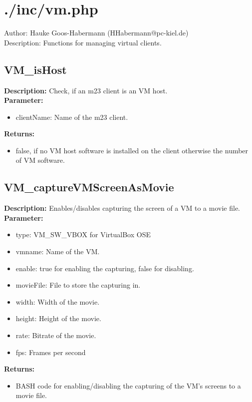\newpage\section{./inc/vm.php}
 Author: Hauke Goos-Habermann (HHabermann@pc-kiel.de)\\
 Description: Functions for managing virtual clients.\\

\subsection{VM\_isHost}
\textbf{Description:} Check, if an m23 client is an VM host.\\
\textbf{Parameter:}
\begin{itemize}
\item clientName: Name of the m23 client.
\end{itemize}
\textbf{Returns:}
\begin{itemize}
\item false, if no VM host software is installed on the client otherwise the number of VM software.
\end{itemize}

\subsection{VM\_captureVMScreenAsMovie}
\textbf{Description:} Enables/disables capturing the screen of a VM to a movie file.\\
\textbf{Parameter:}
\begin{itemize}
\item type: VM\_SW\_VBOX for VirtualBox OSE
\item vmname: Name of the VM.
\item enable: true for enabling the capturing, false for disabling.
\item movieFile: File to store the capturing in.
\item width: Width of the movie.
\item height: Height of the movie.
\item rate: Bitrate of the movie.
\item fps: Frames per second
\end{itemize}
\textbf{Returns:}
\begin{itemize}
\item BASH code for enabling/disabling the capturing of the VM's screens to a movie file.
\end{itemize}

